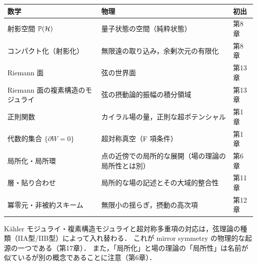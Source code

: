 \begin{center}
\small
\begin{tabular}{p{}p{}p{}}
\textbf{数学} & \textbf{物理} & \textbf{初出}\\ \hline
射影空間 $\mathbb{P}(\mathcal H)$ & 量子状態の空間（純粋状態） & 第8章\\
コンパクト化（射影化） & 無限遠の取り込み，余剰次元の有限化 & 第8章\\
Riemann 面 & 弦の世界面 & 第13章\\
Riemann 面の複素構造のモジュライ & 弦の摂動論的振幅の積分領域 & 第13章\\
正則関数 & カイラル場の量，正則な超ポテンシャル & 第1章\\
代数的集合 $\{\partial W=0\}$ & 超対称真空（F 項条件） & 第1章\\
局所化・局所環 & 点の近傍での局所的な展開（場の理論の局所性とは別） & 第6章\\
層・貼り合わせ & 局所的な場の記述とその大域的整合性 & 第11章\\
冪零元・非被約スキーム & 無限小の揺らぎ，摂動の高次項 & 第12章\\
\end{tabular}
\end{center}

\begin{note}
Kähler モジュライ・複素構造モジュライと超対称多重項の対応は，弦理論の種類（IIA型/IIB型）によって入れ替わる．
これが mirror symmetry の物理的な起源の一つである（第17章）．
また，「局所化」と場の理論の「局所性」は名前が似ているが別の概念であることに注意（第6章）．
\end{note}
